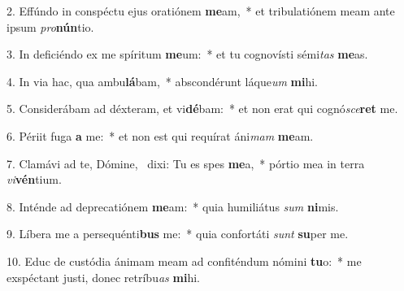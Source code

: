 2. Effúndo in conspéctu ejus oratiónem \textbf{me}am,~*  et tribulatiónem meam ante ipsum \textit{pro}\textbf{nún}tio.\

3. In deficiéndo ex me spíritum \textbf{me}um:~*  et tu cognovísti sémi\textit{tas} \textbf{me}as.\

4. In via hac, qua ambu\textbf{lá}bam,~*  abscondérunt láque\textit{um} \textbf{mi}hi.\

5. Considerábam ad déxteram, et vi\textbf{dé}bam:~*  et non erat qui cognó\textit{sce}\textbf{ret} me.\

6. Périit fuga \textbf{a} me:~*  et non est qui requírat áni\textit{mam} \textbf{me}am.\

7. Clamávi ad te, Dómine, \dag\  dixi: Tu es spes \textbf{me}a,~*  pórtio mea in terra \textit{vi}\textbf{vén}tium.\

8. Inténde ad deprecatiónem \textbf{me}am:~*  quia humiliátus \textit{sum} \textbf{ni}mis.\

9. Líbera me a persequénti\textbf{bus} me:~*  quia confortáti \textit{sunt} \textbf{su}per me.\

10. Educ de custódia ánimam meam ad confiténdum nómini \textbf{tu}o:~*  me exspéctant justi, donec retríbu\textit{as} \textbf{mi}hi.\

